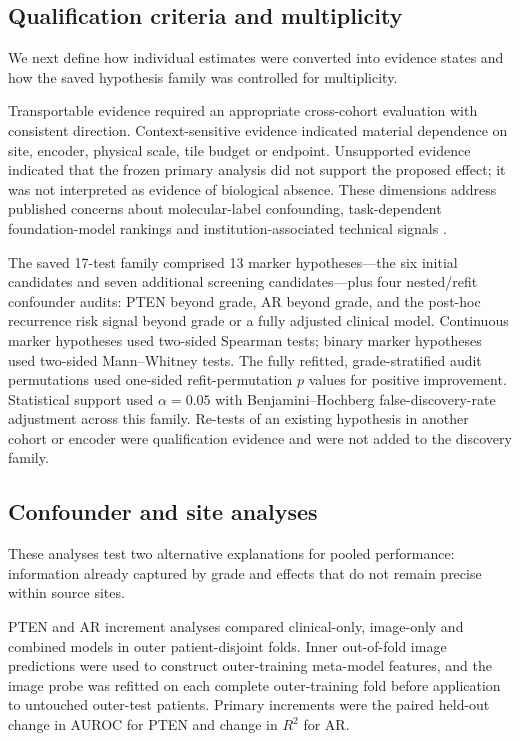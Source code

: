 \subsection{Qualification criteria and multiplicity}

We next define how individual estimates were converted into evidence states and how the
saved hypothesis family was controlled for multiplicity.

Transportable evidence required an appropriate cross-cohort evaluation with consistent
direction. Context-sensitive evidence indicated material dependence on site, encoder,
physical scale, tile budget or endpoint. Unsupported evidence indicated that the frozen
primary analysis did not support the proposed effect; it was not interpreted as evidence of
biological absence. These dimensions address published concerns about molecular-label
confounding, task-dependent foundation-model rankings and institution-associated technical
signals \cite{dawood2026,neidlinger2025,pathorob2026}.

The saved 17-test family comprised 13 marker hypotheses---the six initial candidates and
seven additional screening candidates---plus four nested/refit confounder audits: PTEN
beyond grade, AR beyond grade, and the post-hoc recurrence risk signal beyond grade or a
fully adjusted clinical model.
Continuous marker hypotheses used two-sided Spearman tests; binary marker hypotheses used
two-sided Mann--Whitney tests. The fully refitted, grade-stratified audit permutations used
one-sided refit-permutation $p$ values for positive improvement. Statistical support used
$\alpha=0.05$ with Benjamini--Hochberg false-discovery-rate adjustment across this family.
Re-tests of an existing hypothesis in another cohort or encoder were qualification evidence
and were not added to the discovery family.

\subsection{Confounder and site analyses}

These analyses test two alternative explanations for pooled performance: information already
captured by grade and effects that do not remain precise within source sites.

PTEN and AR increment analyses compared clinical-only, image-only and combined models in
outer patient-disjoint folds. Inner out-of-fold image predictions were used to construct
outer-training meta-model features, and the image probe was refitted on each complete
outer-training fold before application to untouched outer-test patients. Primary increments
were the paired held-out change in AUROC for PTEN and change in $R^2$ for AR.


